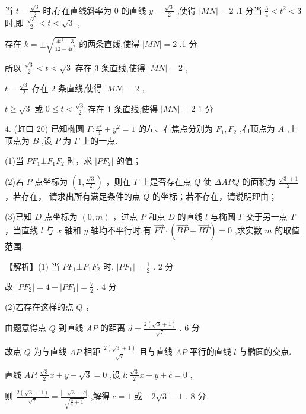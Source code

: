 \documentclass[10pt]{article}
\begin{document}
当 \(t = \frac{\sqrt{3}}{2}\) 时,存在直线斜率为 0 的直线 \(y = \frac{\sqrt{3}}{2}\) ,使得 \(\left| {MN}\right|  = 2\) .1 分当 \(\frac{3}{4} < {t}^{2} < 3\) 时,即 \(\frac{\sqrt{3}}{2} < t < \sqrt{3}\) ,

存在 \(k =  \pm  \sqrt{\frac{4{t}^{2} - 3}{{12} - 4{t}^{2}}}\) 的两条直线,使得 \(\left| {MN}\right|  = 2\) .1 分

所以 \(\frac{\sqrt{3}}{2} < t < \sqrt{3}\) 存在 3 条直线,使得 \(\left| {MN}\right|  = 2\) ,

\(t = \frac{\sqrt{3}}{2}\) 存在 2 条直线,使得 \(\left| {MN}\right|  = 2\) ,

\(t \geq  \sqrt{3}\) 或 \(0 \leq  t < \frac{\sqrt{3}}{2}\) 存在 1 条直线,使得 \(\left| {MN}\right|  = 2\) 1 分

4. (虹口 20) 已知椭圆 \(\Gamma  : \frac{{x}^{2}}{4} + {y}^{2} = 1\) 的左、右焦点分别为 \({F}_{1},{F}_{2}\) ,右顶点为 \(A\) ,上顶点为 \(B\) ,设 \(P\) 为 \(\Gamma\) 上的一点.

(1)当 \(P{F}_{1} \bot  {F}_{1}{F}_{2}\) 时，求 \(\left| {P{F}_{2}}\right|\) 的值；

(2)若 \(P\) 点坐标为 \(\left( {1,\frac{\sqrt{3}}{2}}\right)\) ，则在 \(\Gamma\) 上是否存在点 \(Q\) 使 \({\Delta APQ}\) 的面积为 \(\frac{\sqrt{3} + 1}{2}\) ，若存在， 请求出所有满足条件的点 \(Q\) 的坐标；若不存在，请说明理由；

(3)已知 \(D\) 点坐标为 \(\left( {0,m}\right)\) ，过点 \(P\) 和点 \(D\) 的直线 \(l\) 与椭圆 \(\Gamma\) 交于另一点 \(T\) ，当直线 \(l\) 与 \(x\) 轴和 \(y\) 轴均不平行时,有 \(\overrightarrow{PT} \cdot  \left( {\overrightarrow{BP} + \overrightarrow{BT}}\right)  = 0\) ,求实数 \(m\) 的取值范围.

【解析】(1) 当 \(P{F}_{1} \bot  {F}_{1}{F}_{2}\) 时, \(\left| {P{F}_{1}}\right|  = \frac{1}{2}\) . 2 分

故 \(\left| {P{F}_{2}}\right|  = 4 - \left| {P{F}_{1}}\right|  = \frac{7}{2}\) . 4 分

(2)若存在这样的点 \(Q\) ，

由题意得点 \(Q\) 到直线 \({AP}\) 的距离 \(d = \frac{2\left( {\sqrt{3} + 1}\right) }{\sqrt{7}}\) . 6 分

故点 \(Q\) 为与直线 \({AP}\) 相距 \(\frac{2\left( {\sqrt{3} + 1}\right) }{\sqrt{7}}\) 且与直线 \({AP}\) 平行的直线 \(l\) 与椭圆的交点.

直线 \({AP} : \frac{\sqrt{3}}{2}x + y - \sqrt{3} = 0\) ,设 \(l : \frac{\sqrt{3}}{2}x + y + c = 0\) ,

则 \(\frac{2\left( {\sqrt{3} + 1}\right) }{\sqrt{7}} = \frac{\left| -\sqrt{3} - c\right| }{\sqrt{\frac{3}{4} + 1}}\) ,解得 \(c = 1\) 或 \(- 2\sqrt{3} - 1\) . 8 分
\end{document}

